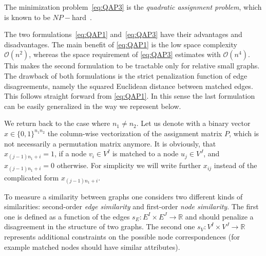 The minimization problem~\eqref{eq:QAP3} is the \emph{quadratic assignment problem}, which is known to be $NP-$hard~\cite{Burkard98thequadratic,Sahni1974}.

The two formulations~\eqref{eq:QAP1} and~\eqref{eq:QAP3} have their advantages and disadvantages. The main benefit of \eqref{eq:QAP1} is the low space complexity $\mathcal O(n^2)$, whereas the space requirement of \eqref{eq:QAP3} estimates with $\mathcal O(n^4)$. This makes the second formulation to be tractable only for relative small graphs. The drawback of both formulations is the strict penalization function of edge disagreements, namely the squared Euclidean distance between matched edges. This follows straight forward from \eqref{eq:QAP1}. In this sense the last formulation can be easily generalized in the way we represent below. 

We return back to the case where $n_1\not=n_2$. Let us denote with a binary vector $x\in \{0,1\}^{n_1n_2}$ the column-wise vectorization of the assignment matrix $P$, which is not necessarily a permutation matrix anymore. It is obviously, that $x_{(j-1)n_1+i}=1$, if a node $v_i\in V^I$ is matched to a node $u_j\in V^J$, and $x_{(j-1)n_1+i}=0$ otherwise. For simplicity we will write further $x_{ij}$ instead of the complicated form $x_{(j-1)n_1+i}$.
 

To measure a similarity between graphs one considers two different kinds of similarities: second-order \emph{edge similarity} and first-order \emph{node similarity}. The first one is defined as a function of the edges $s_E:E^I\times E^J\rightarrow\mathbb{R}$ and should penalize a disagreement in the structure of two graphs. The second one $s_V:V^I\times V^J\rightarrow\mathbb{R}$ represents additional constraints on the possible node correspondences (for example matched nodes should have similar attributes).


